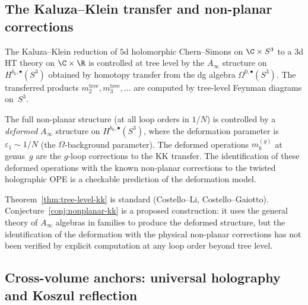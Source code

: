 \subsection{The Kaluza--Klein transfer and non-planar corrections}
\label{subsec:kk-transfer-nonplanar}

\begin{theorem}
\label{thm:tree-level-kk}
The Kaluza--Klein reduction of $5$d holomorphic Chern--Simons on
$\C \times S^3$ to a $3$d HT theory on $\C \times \R$ is
controlled at tree level by the $A_\infty$ structure on
$H^{b_0, \bullet}(S^3)$ obtained by homotopy transfer from the dg
algebra $\Omega^{0,\bullet}(S^3)$. The transferred products
$m_2^{\mathrm{tree}}, m_3^{\mathrm{tree}}, \ldots$ are computed by
tree-level Feynman diagrams on~$S^3$.
\end{theorem}

\begin{conjecture}
\label{conj:nonplanar-kk}
The full non-planar structure \textup{(}at all loop orders in
$1/N$\textup{)} is controlled by a \emph{deformed} $A_\infty$
structure on $H^{b_0, \bullet}(S^3)$, where the deformation
parameter is $\varepsilon_1 \sim 1/N$
\textup{(}the $\Omega$-background parameter\textup{)}. The
deformed operations $m_k^{(g)}$ at genus~$g$ are the $g$-loop
corrections to the KK transfer. The identification of these
deformed operations with the known non-planar corrections to the
twisted holographic OPE is a checkable prediction of the deformation
model.
\end{conjecture}

\begin{remark}[Scope]
\label{rem:kk-transfer-scope}
Theorem~\ref{thm:tree-level-kk} is standard
\textup{(}Costello--Li, Costello--Gaiotto\textup{)}.
Conjecture~\ref{conj:nonplanar-kk} is a proposed construction: it uses
the general theory of $A_\infty$ algebras
in families to produce the deformed structure, but the
identification of the deformation with the physical non-planar
corrections has not been verified by explicit computation at any
loop order beyond tree level.
\end{remark}

\subsection{Cross-volume anchors: universal holography and Koszul reflection}
\label{subsec:foundations-anchors}

